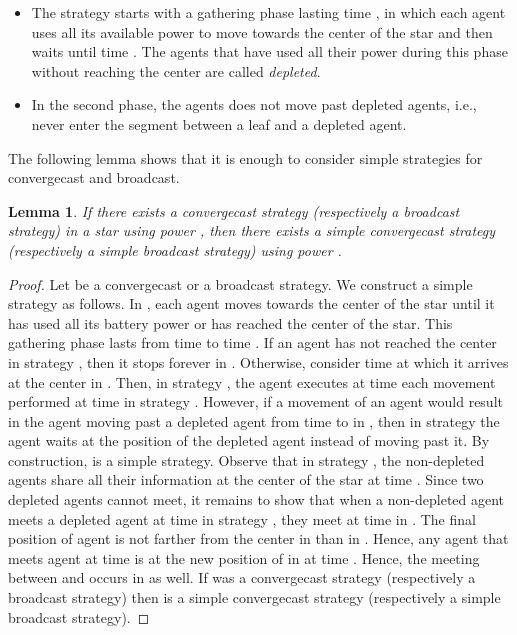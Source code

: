 \documentclass{article}
\newtheorem{lemma}{Lemma}
\newcommand\strat{\mbox{strategy}\xspace}
\newcommand\ccast{convergecast\xspace}
\begin{document}
\begin{itemize}
\item The strategy starts with a gathering phase lasting time ,
in which each agent uses all its available power to move towards the center of the star and then waits until time . The agents that have used all their power during this phase without reaching the center are called \emph{depleted}.
\item In the second phase, the agents does not move past depleted agents, i.e., never enter the segment between a leaf and a depleted agent.
\end{itemize}
The following lemma shows that it is enough to consider simple strategies for convergecast and broadcast.

\begin{lemma}\label{cl:simpl}
If there exists a {\ccast} {\strat} (respectively a broadcast strategy) in a star using power , then there exists a simple {\ccast} {\strat} (respectively a simple broadcast strategy) using power .
\end{lemma}

\begin{proof}
Let  be a convergecast or a broadcast {\strat}. We construct a simple {\strat}  as follows. In , each agent 
moves towards the center of the star until it has used all its battery power or has reached the center of the star. This gathering phase lasts from time  to time . If an agent has not reached the center in strategy , then it stops forever in .
Otherwise, consider time  at which it arrives at the center in . Then, in strategy , the agent executes at time  each movement performed at time  in {\strat} . However, if a movement of an agent would result in the agent moving past a depleted agent from time  to  in , then in strategy  the agent waits at the position of the depleted agent instead of moving past it.  By construction,  is a simple {\strat}. Observe that in {\strat} , the non-depleted agents share all their information at the center of the star at time . 
Since two depleted agents cannot meet, it remains to show that when a non-depleted agent  meets a depleted agent  at time  in {\strat} , they meet at time  in . The final position of agent  is not farther from the center in  than in . Hence, any agent  that meets agent  at time  is at the new position of  in  at time . Hence, the meeting between  and  occurs in  as well. If  was a convergecast strategy (respectively a broadcast strategy) then  is a simple convergecast strategy (respectively a simple broadcast strategy).
\end{proof}
\end{document}
